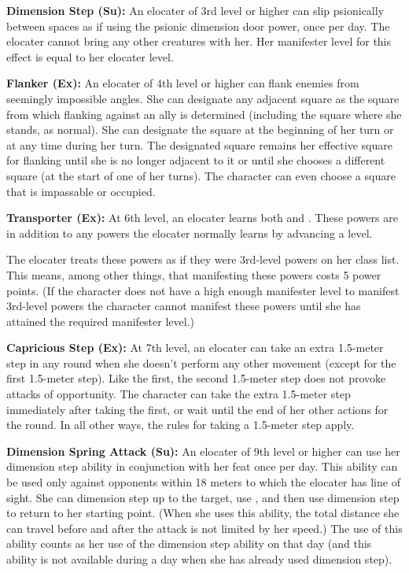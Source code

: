 {\textbf{Dimension Step (Su):} An elocater of 3rd level or higher can slip psionically between spaces as if using the psionic dimension door power, once per day. The elocater cannot bring any other creatures with her. Her manifester level for this effect is equal to her elocater level.

\textbf{Flanker (Ex):} An elocater of 4th level or higher can flank enemies from seemingly impossible angles. She can designate any adjacent square as the square from which flanking against an ally is determined (including the square where she stands, as normal). She can designate the square at the beginning of her turn or at any time during her turn. The designated square remains her effective square for flanking until she is no longer adjacent to it or until she chooses a different square (at the start of one of her turns). The character can even choose a square that is impassable or occupied.

\textbf{Transporter (Ex):} At 6th level, an elocater learns both  and . These powers are in addition to any powers the elocater normally learns by advancing a level.

The elocater treats these powers as if they were 3rd-level powers on her class list. This means, among other things, that manifesting these powers costs 5 power points. (If the character does not have a high enough manifester level to manifest 3rd-level powers the character cannot manifest these powers until she has attained the required manifester level.)

\textbf{Capricious Step (Ex):} At 7th level, an elocater can take an extra 1.5-meter step in any round when she doesn't perform any other movement (except for the first 1.5-meter step). Like the first, the second 1.5-meter step does not provoke attacks of opportunity. The character can take the extra 1.5-meter step immediately after taking the first, or wait until the end of her other actions for the round. In all other ways, the rules for taking a 1.5-meter step apply.

\textbf{Dimension Spring Attack (Su):} An elocater of 9th level or higher can use her dimension step ability in conjunction with her  feat once per day. This ability can be used only against opponents within 18 meters to which the elocater has line of sight. She can dimension step up to the target, use , and then use dimension step to return to her starting point. (When she uses this ability, the total distance she can travel before and after the attack is not limited by her speed.) The use of this ability counts as her use of the dimension step ability on that day (and this ability is not available during a day when she has already used dimension step).

}
